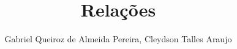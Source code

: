 
  \title{Relações}
  \author{Gabriel Queiroz de Almeida Pereira, Cleydson Talles Araujo}
  
  \maketitle
    